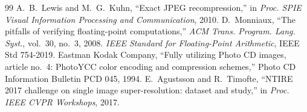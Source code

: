 \documentclass[10pt,twocolumn]{article}
\begin{document}
\begin{thebibliography}{99}
 A.~B.~Lewis and M.~G.~Kuhn, ``Exact JPEG recompression,'' in \emph{Proc. SPIE Visual Information Processing and Communication}, 2010.
 D.~Monniaux, ``The pitfalls of verifying floating-point computations,'' \emph{ACM Trans. Program. Lang. Syst.}, vol.~30, no.~3, 2008.
 \emph{IEEE Standard for Floating-Point Arithmetic}, IEEE Std 754-2019.
 Eastman Kodak Company, ``Fully utilizing Photo CD images, article no.~4: PhotoYCC color encoding and compression schemes,'' Photo CD Information Bulletin PCD 045, 1994.
 E.~Agustsson and R.~Timofte, ``NTIRE 2017 challenge on single image super-resolution: dataset and study,'' in \emph{Proc. IEEE CVPR Workshops}, 2017.
\end{thebibliography}
\end{document}

